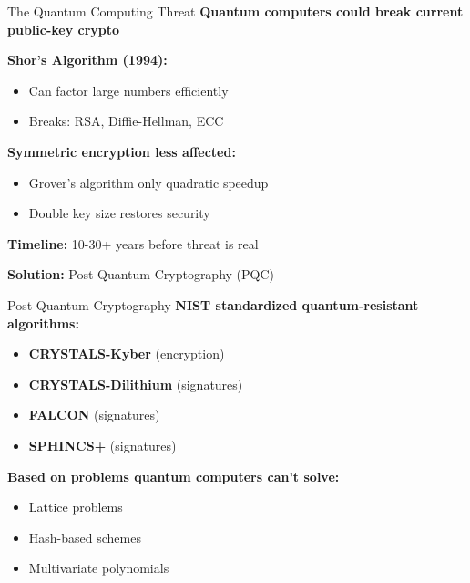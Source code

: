 \documentclass{beamer}
\begin{document}
\begin{frame}{The Quantum Computing Threat}
\textbf{Quantum computers could break current public-key crypto}

\vspace{0.3cm}
\textbf{Shor's Algorithm (1994):}
\begin{itemize}
    \item Can factor large numbers efficiently
    \item Breaks: RSA, Diffie-Hellman, ECC
\end{itemize}

\vspace{0.3cm}
\textbf{Symmetric encryption less affected:}
\begin{itemize}
    \item Grover's algorithm only quadratic speedup
    \item Double key size restores security
\end{itemize}

\vspace{0.3cm}
\textbf{Timeline:} 10-30+ years before threat is real

\textbf{Solution:} Post-Quantum Cryptography (PQC)

\end{frame}

\begin{frame}{Post-Quantum Cryptography}
\textbf{NIST standardized quantum-resistant algorithms:}

\vspace{0.3cm}
\begin{itemize}
    \item \textbf{CRYSTALS-Kyber} (encryption)
    \item \textbf{CRYSTALS-Dilithium} (signatures)
    \item \textbf{FALCON} (signatures)
    \item \textbf{SPHINCS+} (signatures)
\end{itemize}

\vspace{0.3cm}
\textbf{Based on problems quantum computers can't solve:}
\begin{itemize}
    \item Lattice problems
    \item Hash-based schemes
    \item Multivariate polynomials
\end{itemize}
\end{frame}
\end{document}
